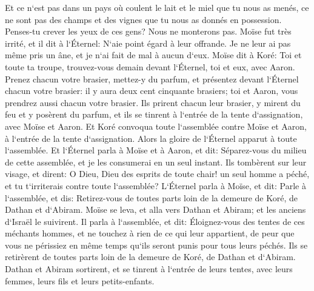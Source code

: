 \verse Et ce n`est pas dans un pays où coulent le lait et le miel que tu nous as menés, ce ne sont pas des champs et des vignes que tu nous as donnés en possession. Penses-tu crever les yeux de ces gens? Nous ne monterons pas. 
\verse Moïse fut très irrité, et il dit à l`Éternel: N`aie point égard à leur offrande. Je ne leur ai pas même pris un âne, et je n`ai fait de mal à aucun d`eux. 
\verse Moïse dit à Koré: Toi et toute ta troupe, trouvez-vous demain devant l`Éternel, toi et eux, avec Aaron. 
\verse Prenez chacun votre brasier, mettez-y du parfum, et présentez devant l`Éternel chacun votre brasier: il y aura deux cent cinquante brasiers; toi et Aaron, vous prendrez aussi chacun votre brasier. 
\verse Ils prirent chacun leur brasier, y mirent du feu et y posèrent du parfum, et ils se tinrent à l`entrée de la tente d`assignation, avec Moïse et Aaron. 
\verse Et Koré convoqua toute l`assemblée contre Moïse et Aaron, à l`entrée de la tente d`assignation. Alors la gloire de l`Éternel apparut à toute l`assemblée. 
\verse Et l`Éternel parla à Moïse et à Aaron, et dit: 
\verse Séparez-vous du milieu de cette assemblée, et je les consumerai en un seul instant. 
\verse Ils tombèrent sur leur visage, et dirent: O Dieu, Dieu des esprits de toute chair! un seul homme a péché, et tu t`irriterais contre toute l`assemblée? 
\verse L`Éternel parla à Moïse, et dit: 
\verse Parle à l`assemblée, et dis: Retirez-vous de toutes parts loin de la demeure de Koré, de Dathan et d`Abiram. 
\verse Moïse se leva, et alla vers Dathan et Abiram; et les anciens d`Israël le suivirent. 
\verse Il parla à l`assemblée, et dit: Éloignez-vous des tentes de ces méchants hommes, et ne touchez à rien de ce qui leur appartient, de peur que vous ne périssiez en même temps qu`ils seront punis pour tous leurs péchés. 
\verse Ils se retirèrent de toutes parts loin de la demeure de Koré, de Dathan et d`Abiram. Dathan et Abiram sortirent, et se tinrent à l`entrée de leurs tentes, avec leurs femmes, leurs fils et leurs petits-enfants. 
